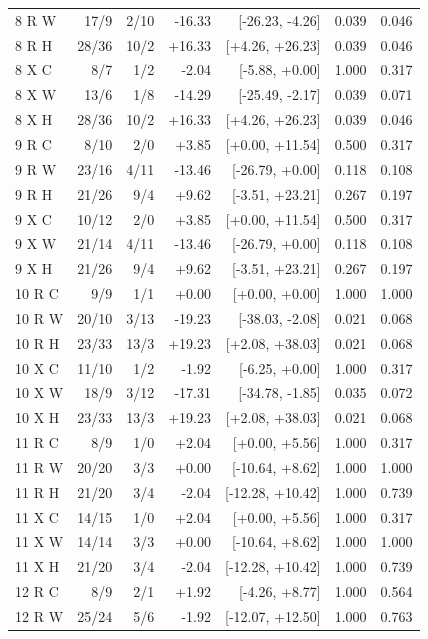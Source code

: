 {\begin{longtable}{lrrrrrr}
8 R W & 17/9 & 2/10 & -16.33 & [-26.23, -4.26] & 0.039 & 0.046\\
8 R H & 28/36 & 10/2 & +16.33 & [+4.26, +26.23] & 0.039 & 0.046\\
8 X C & 8/7 & 1/2 & -2.04 & [-5.88, +0.00] & 1.000 & 0.317\\
8 X W & 13/6 & 1/8 & -14.29 & [-25.49, -2.17] & 0.039 & 0.071\\
8 X H & 28/36 & 10/2 & +16.33 & [+4.26, +26.23] & 0.039 & 0.046\\
9 R C & 8/10 & 2/0 & +3.85 & [+0.00, +11.54] & 0.500 & 0.317\\
9 R W & 23/16 & 4/11 & -13.46 & [-26.79, +0.00] & 0.118 & 0.108\\
9 R H & 21/26 & 9/4 & +9.62 & [-3.51, +23.21] & 0.267 & 0.197\\
9 X C & 10/12 & 2/0 & +3.85 & [+0.00, +11.54] & 0.500 & 0.317\\
9 X W & 21/14 & 4/11 & -13.46 & [-26.79, +0.00] & 0.118 & 0.108\\
9 X H & 21/26 & 9/4 & +9.62 & [-3.51, +23.21] & 0.267 & 0.197\\
10 R C & 9/9 & 1/1 & +0.00 & [+0.00, +0.00] & 1.000 & 1.000\\
10 R W & 20/10 & 3/13 & -19.23 & [-38.03, -2.08] & 0.021 & 0.068\\
10 R H & 23/33 & 13/3 & +19.23 & [+2.08, +38.03] & 0.021 & 0.068\\
10 X C & 11/10 & 1/2 & -1.92 & [-6.25, +0.00] & 1.000 & 0.317\\
10 X W & 18/9 & 3/12 & -17.31 & [-34.78, -1.85] & 0.035 & 0.072\\
10 X H & 23/33 & 13/3 & +19.23 & [+2.08, +38.03] & 0.021 & 0.068\\
11 R C & 8/9 & 1/0 & +2.04 & [+0.00, +5.56] & 1.000 & 0.317\\
11 R W & 20/20 & 3/3 & +0.00 & [-10.64, +8.62] & 1.000 & 1.000\\
11 R H & 21/20 & 3/4 & -2.04 & [-12.28, +10.42] & 1.000 & 0.739\\
11 X C & 14/15 & 1/0 & +2.04 & [+0.00, +5.56] & 1.000 & 0.317\\
11 X W & 14/14 & 3/3 & +0.00 & [-10.64, +8.62] & 1.000 & 1.000\\
11 X H & 21/20 & 3/4 & -2.04 & [-12.28, +10.42] & 1.000 & 0.739\\
12 R C & 8/9 & 2/1 & +1.92 & [-4.26, +8.77] & 1.000 & 0.564\\
12 R W & 25/24 & 5/6 & -1.92 & [-12.07, +12.50] & 1.000 & 0.763\\

\end{longtable}}
